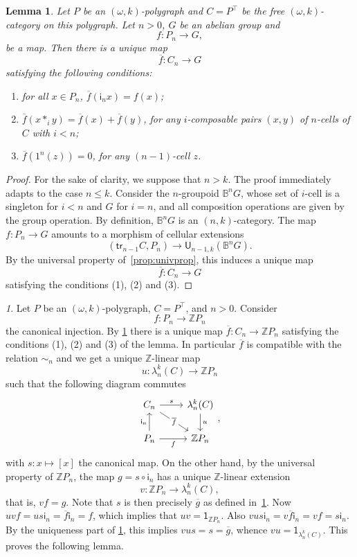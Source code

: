 \documentclass[reqno]{amsart}
\theoremstyle{plain}
\newtheorem{lemma}[subsubsection]{Lemma}
\theoremstyle{definition}
\theoremstyle{remark}
\newtheorem{paragr}[subsubsection]{} %
\newcommand{\nmbr}[1]{\mathbb #1}
\newcommand{\Z}{\nmbr{Z}}
\newcommand{\pair}[2]{(#1,#2)}       %
\newcommand{\geninc}{\mathsf{i}} %
\newcommand{\unit}[1]{1^{#1}} %
\newcommand{\Unit}[1]{\mathsf{1}_{#1}}%
\newcommand{\functor}[1]{\mathsf{#1}} %
\newcommand{\trk}[1]{\functor{tr}_{#1}}%
\newcommand{\fgf}[1]{\functor{U}_{#1}} %
\newcommand{\abel}{\functor{\lambda}} %
\newcommand{\abelk}[1]{\functor{\abel}^{#1}}%
\newcommand{\B}{\mathbb{B}} %
\newcommand{\comp}[1]{\ast_{#1}} %
\newcommand{\frgp}[1]{#1^\top} %
\newcommand{\ook}[1]{\ensuremath{\pair{\omega}{#1}}}
\newcommand{\pk}[2]{\ensuremath{\pair{#1}{#2}}}
\newcommand{\clx}[2]{\pair{#1}{#2}}%
\newcommand{\nbd}{\nobreakdash} %
\newcommand{\extend}[1]{\overline{#1}} %
\begin{document}
\begin{lemma}\label{lemma:delooping}
  Let $P$ be an $\ook k$\nbd-polygraph and $C=\frgp P$ be the free $\ook
  k$\nbd-category on this polygraph. Let $n > 0$, $G$ be an
  abelian group and 
  \[
    f \colon P_n \to G,
  \]
  be a map.
  Then there is a unique map
  \[\extend f\colon C_n\to G\]
 satisfying the following conditions:
 \begin{enumerate}
  \item  for all $x\in P_n$, $\extend{f}(\geninc_n x)=f(x)$;
  \item $\extend{f}(x \comp{i} y)=\extend{f}(x)+\extend{f}(y)$, for any $i$\nbd-composable pairs 
    $(x,y)$ of $n$\nbd-cells of $C$ with $i<n$;
  \item $\extend f(\unit n(z))=0$, for any $(n-1)$\nbd-cell $z$.
  \end{enumerate}
\end{lemma}
\begin{proof}
 For the sake of clarity, we suppose that $n>k$. The proof immediately
 adapts to the case $n\leq k$.
Consider the $n$\nbd-groupoid $\B^nG$,
whose set of $i$\nbd-cell is a singleton for $i<n$ and $G$ for $i=n$,
and all composition operations are given by the group
operation. By definition, $\B^nG$ is an \pk{n}{k}-category. The map
$f\colon P_n\to G$ amounts to a morphism of cellular extensions
\[\clx{\trk{n-1}C}{P_n}\to \fgf{n-1,k}(\B^nG).\]
By the universal property of~\cref{prop:univprop}, this induces a
unique map
\[
  \extend f\colon C_n\to G
  \]
satisfying the conditions (1),
(2) and (3).  
\end{proof}
\begin{paragr}
  Let $P$ be an \ook{k}-polygraph, $C=\frgp P$, and $n>0$. Consider
  \[f\colon P_n\to \Z P_n\]
  the canonical injection. By \cref{lemma:delooping} there is a unique
  map $\extend f\colon C_n\to \Z P_n$ satisfying the conditions (1),
  (2) and (3) of the lemma. In particular $\extend f$ is compatible with 
  the relation $\sim_n$ and we get a unique $\Z$-linear map
  \[u\colon \abelk{k}_n(C)\to \Z P_n\]
  such that the following diagram commutes
  \[
    \begin{tikzcd}
      C_n \ar[rd,"\extend{f}"description]\ar[r,"s"]& \abelk{k}_n(C)\ar[d,"u"]\\
      P_n \ar[r,"f"'] \ar[u,"\geninc_n"]& \Z P_n
    \end{tikzcd},
  \]
  with $s:x\mapsto [x]$ the canonical map. On the other hand, by the
  universal property of $\Z P_n$, the map $g=s\circ\geninc_n$ has a unique
  $\Z$-linear extension
  \[v\colon \Z P_n\to\abelk{k}_n(C),\]
  that is, $vf=g$. Note that $s$ is then precisely $\extend g$ as
  defined in~\cref{lemma:delooping}. Now $uvf=us\geninc_n=\extend{f}\geninc_n=f$, which implies that $uv=\Unit{\Z P_n}$. Also
  $vus\geninc_n=v\extend{f}\geninc_n=vf=s\geninc_n$. By the uniqueness
  part of \cref{lemma:delooping}, this implies $vus=s=\extend{g}$,
  whence $vu=\Unit{\abelk{k}_n(C)}$. This proves the following lemma.
 \end{paragr}
\end{document}

